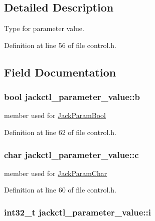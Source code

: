 \subsection{\-Detailed \-Description}
\-Type for parameter value. 

\-Definition at line 56 of file control.\-h.



\subsection{\-Field \-Documentation}
\hypertarget{unionjackctl__parameter__value_a9765ef8c57c7b9993c645e985cc4a75d}{
\subsubsection[{b}]{\setlength{\rightskip}{0pt plus 5cm}bool {\bf jackctl\-\_\-parameter\-\_\-value\-::b}}}\label{dc/d32/unionjackctl__parameter__value_a9765ef8c57c7b9993c645e985cc4a75d}


member used for \hyperlink{control_8h_ac71832cf5445a694a178d15345d67840a766feed3831809abe9b67872086f241f}{\-Jack\-Param\-Bool} 



\-Definition at line 62 of file control.\-h.

\hypertarget{unionjackctl__parameter__value_a818569c9b5ff786af53e83607e46127c}{
\subsubsection[{c}]{\setlength{\rightskip}{0pt plus 5cm}char {\bf jackctl\-\_\-parameter\-\_\-value\-::c}}}\label{dc/d32/unionjackctl__parameter__value_a818569c9b5ff786af53e83607e46127c}


member used for \hyperlink{control_8h_ac71832cf5445a694a178d15345d67840aab44adbfbb163aa6b6ad52eac90b2bfb}{\-Jack\-Param\-Char} 



\-Definition at line 60 of file control.\-h.

\hypertarget{unionjackctl__parameter__value_a34bd19127b1d1f1b45dd62557052ed3f}{
\subsubsection[{i}]{\setlength{\rightskip}{0pt plus 5cm}int32\-\_\-t {\bf jackctl\-\_\-parameter\-\_\-value\-::i}}}\label{dc/d32/unionjackctl__parameter__value_a34bd19127b1d1f1b45dd62557052ed3f}



